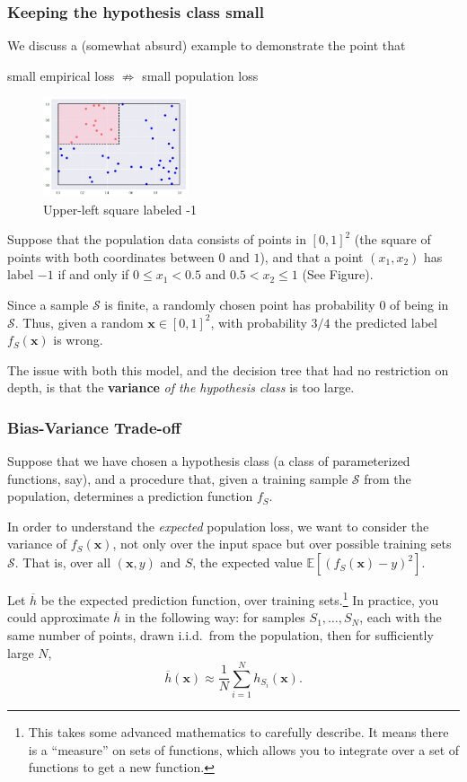 \documentclass[smaller]{beamer}
\theoremstyle{example}
\newcommand{\x}{\textbf{x}}
\begin{document}
\begin{frame}
    \frametitle{Keeping the hypothesis class small}
We discuss a (somewhat absurd) example to demonstrate the point that 
\begin{center} small empirical loss $\not\Rightarrow$ small population loss\end{center}

\begin{figure}
    \begin{center}
        \includegraphics[width=0.38\textwidth]{../../Images/fourth_square-13v37.png}
    \end{center}
    \caption{Upper-left square labeled -1}
\end{figure}

Suppose that the population data consists of points in $[0,1]^2$ (the square of points with both coordinates between $0$ and $1$), and that a point $(x_1,x_2)$ has label $-1$ if and only if $0\le x_1 < 0.5$ and $0.5< x_2 \le 1$ (See Figure).
\vspace*{12pt}

Since a sample $\mathcal S$ is finite, a randomly chosen point has probability $0$ of being in $\mathcal S$. Thus, given a random $\x\in[0,1]^2$, with probability $3/4$ the predicted label $f_S(\x)$ is wrong.

The issue with both this model, and the decision tree that had no restriction on depth, is that the \textbf{variance} \textit{of the hypothesis class} is too large.
\end{frame}

\begin{frame}
    \frametitle{Bias-Variance Trade-off}
    Suppose that we have chosen a hypothesis class (a class of parameterized functions, say), and a procedure that, given a training sample $\mathcal S$ from the population, determines a prediction function $f_S$.

    In order to understand the \textit{expected} population loss, we want to consider the variance of $f_S(\x)$, not only over the input space but over possible training sets $\mathcal S$. That is, over all $(\x, y)$ and $S$, the expected value $\mathbb E[(f_S(\x) - y)^2]$.

    Let $\overline{h}$ be the expected prediction function, over training sets.\footnote{This takes some advanced mathematics to carefully describe. It means there is a ``measure'' on sets of functions, which allows you to integrate over a set of functions to get a new function.} In practice, you could approximate $\overline{h}$ in the following way: for samples $S_1,\ldots,S_N$, each with the same number of points, drawn i.i.d.\ from the population, then for sufficiently large $N$, 
        \[\overline{h}(\x) \approx \frac{1}{N}\sum_{i=1}^Nh_{S_i}(\x).\]
\end{frame}
\end{document}
